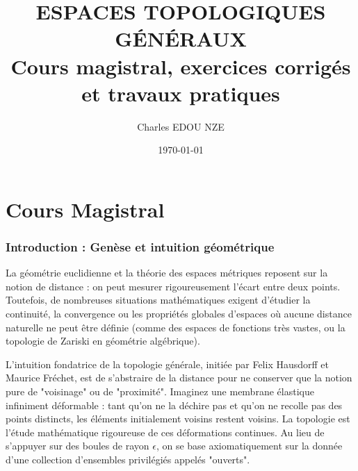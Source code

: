 \documentclass[11pt,a4paper]{article}
\title{\Huge ESPACES TOPOLOGIQUES GÉNÉRAUX \\ \large Cours magistral, exercices corrigés et travaux pratiques}
\author{\Large Charles EDOU NZE}
\date{\today}
\begin{document}
\maketitle
\tableofcontents
\newpage

\part{Cours Magistral}
\section{Introduction : Genèse et intuition géométrique}

La géométrie euclidienne et la théorie des espaces métriques reposent sur la notion de distance : on peut mesurer rigoureusement l'écart entre deux points. Toutefois, de nombreuses situations mathématiques exigent d'étudier la continuité, la convergence ou les propriétés globales d'espaces où aucune distance naturelle ne peut être définie (comme des espaces de fonctions très vastes, ou la topologie de Zariski en géométrie algébrique).

L'intuition fondatrice de la topologie générale, initiée par Felix Hausdorff et Maurice Fréchet, est de s'abstraire de la distance pour ne conserver que la notion pure de "voisinage" ou de "proximité". Imaginez une membrane élastique infiniment déformable : tant qu'on ne la déchire pas et qu'on ne recolle pas des points distincts, les éléments initialement voisins restent voisins. La topologie est l'étude mathématique rigoureuse de ces déformations continues. Au lieu de s'appuyer sur des boules de rayon $\epsilon$, on se base axiomatiquement sur la donnée d'une collection d'ensembles privilégiés appelés "ouverts".

\begin{center}
\end{center}
\end{document}
